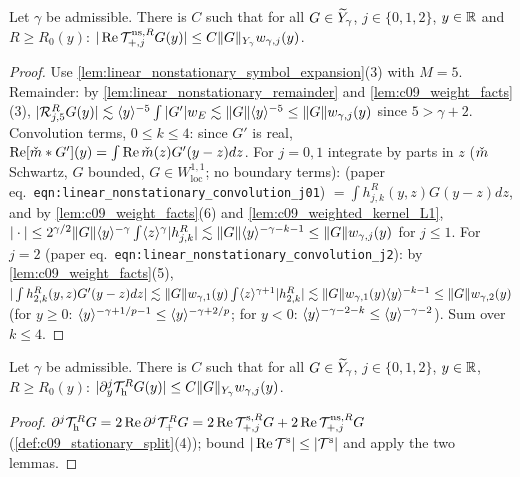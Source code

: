 \begin{lemma}
  \label{lem:c09_nonstationary_contribution}
  Let $\gamma$ be admissible. There is $C$ such that for all $G\in\sq Y_\gamma$, $j\in\{0,1,2\}$, $y\in\R$ and $R\ge R_0(y)$:
  $|\operatorname{Re}\mc T^{\textup{ns},R}_{+,j}G(y)|\le C\|G\|_{Y_\gamma}w_{\gamma,j}(y)$.
\end{lemma}
\begin{proof}
  Use \cref{lem:linear_nonstationary_symbol_expansion}(3) with $M=5$.
  Remainder: by \cref{lem:linear_nonstationary_remainder} and \cref{lem:c09_weight_facts}(3), $|\mc R^R_{j,5}G(y)|\lesssim\ang y^{-5}\int|G'|w_E\lesssim\|G\|\ang{y}^{-5}\le\|G\|w_{\gamma,j}(y)$
  since $5>\gamma+2$.
  Convolution terms, $0\le k\le4$: since $G'$ is real, $\operatorname{Re}[\widecheck{m}*G'](y)=\int\operatorname{Re}\widecheck{m}(z)G'(y-z)dz$.
  For $j=0,1$ integrate by parts in $z$ ($\widecheck m$ Schwartz, $G$ bounded, $G\in W^{1,1}_{\mathrm{loc}}$; no boundary terms):
  (paper eq.~\texttt{eqn:linear\_nonstationary\_convolution\_j01}) $=\int h^R_{j,k}(y,z)G(y-z)dz$, and by \cref{lem:c09_weight_facts}(6) and \cref{lem:c09_weighted_kernel_L1},
  $|\cdot|\le2^{\gamma/2}\|G\|\ang y^{-\gamma}\int\ang z^\gamma|h^R_{j,k}|\lesssim\|G\|\ang{y}^{-\gamma-k-1}\le\|G\|w_{\gamma,j}(y)$ for $j\le1$.
  For $j=2$ (paper eq.~\texttt{eqn:linear\_nonstationary\_convolution\_j2}): by \cref{lem:c09_weight_facts}(5),
  $|\int h^R_{2,k}(y,z)G'(y-z)dz|\lesssim\|G\|w_{\gamma,1}(y)\int\ang z^{\gamma+1}|h^R_{2,k}|\lesssim\|G\|w_{\gamma,1}(y)\ang y^{-k-1}\le\|G\|w_{\gamma,2}(y)$
  (for $y\ge0$: $\ang y^{-\gamma+1/p-1}\le\ang y^{-\gamma+2/p}$; for $y<0$: $\ang y^{-\gamma-2-k}\le\ang y^{-\gamma-2}$). Sum over $k\le4$.
\end{proof}

\begin{lemma}
  \label{lem:c09_truncated_high_bound}
  Let $\gamma$ be admissible. There is $C$ such that for all $G\in\sq Y_\gamma$, $j\in\{0,1,2\}$, $y\in\R$, $R\ge R_0(y)$:
  $|\partial_y^j\mc T^R_{\textup{h}}G(y)|\le C\|G\|_{Y_\gamma}w_{\gamma,j}(y)$.
\end{lemma}
\begin{proof}
  $\partial^j\mc T^R_{\textup{h}}G=2\operatorname{Re}\partial^j\mc T^R_+G=2\operatorname{Re}\mc T^{\textup{s},R}_{+,j}G+2\operatorname{Re}\mc T^{\textup{ns},R}_{+,j}G$
  (\cref{def:c09_stationary_split}(4)); bound $|\operatorname{Re}\mc T^{\textup{s}}|\le|\mc T^{\textup{s}}|$ and apply the two lemmas.
\end{proof}


